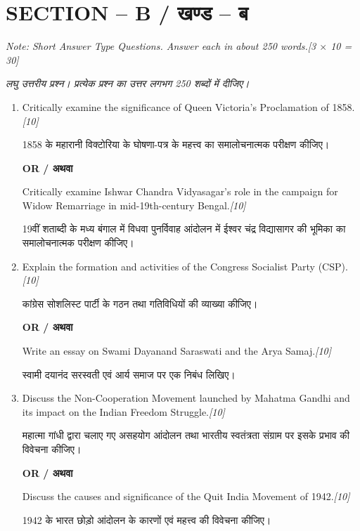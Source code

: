 \documentclass[11pt,a4paper]{article}
\newcommand{\pts}[1]{\hfill \textit{[#1]}}
\begin{document}
\bigskip

\section*{SECTION -- B / खण्ड -- ब}
\noindent \textit{Note: Short Answer Type Questions. Answer each in about 250 words.}\pts{3 $\times$ 10 = 30}

\noindent \textit{लघु उत्तरीय प्रश्न। प्रत्येक प्रश्न का उत्तर लगभग 250 शब्दों में दीजिए।}

\begin{enumerate}[label=\textbf{\arabic*.},leftmargin=*,start=2,itemsep=12pt]

  \item Critically examine the significance of Queen Victoria's Proclamation of 1858.\pts{10}
  
  1858 के महारानी विक्टोरिया के घोषणा-पत्र के महत्त्व का समालोचनात्मक परीक्षण कीजिए।

  \begin{center}\textbf{OR / अथवा}\end{center}

  Critically examine Ishwar Chandra Vidyasagar's role in the campaign for Widow Remarriage in mid-19th-century Bengal.\pts{10}
  
  19वीं शताब्दी के मध्य बंगाल में विधवा पुनर्विवाह आंदोलन में ईश्वर चंद्र विद्यासागर की भूमिका का समालोचनात्मक परीक्षण कीजिए।

  \item Explain the formation and activities of the Congress Socialist Party (CSP).\pts{10}
  
  कांग्रेस सोशलिस्ट पार्टी के गठन तथा गतिविधियों की व्याख्या कीजिए।

  \begin{center}\textbf{OR / अथवा}\end{center}

  Write an essay on Swami Dayanand Saraswati and the Arya Samaj.\pts{10}
  
  स्वामी दयानंद सरस्वती एवं आर्य समाज पर एक निबंध लिखिए।

  \item Discuss the Non-Cooperation Movement launched by Mahatma Gandhi and its impact on the Indian Freedom Struggle.\pts{10}
  
  महात्मा गांधी द्वारा चलाए गए असहयोग आंदोलन तथा भारतीय स्वतंत्रता संग्राम पर इसके प्रभाव की विवेचना कीजिए।

  \begin{center}\textbf{OR / अथवा}\end{center}

  Discuss the causes and significance of the Quit India Movement of 1942.\pts{10}
  
  1942 के भारत छोड़ो आंदोलन के कारणों एवं महत्त्व की विवेचना कीजिए।

\end{enumerate}
\end{document}

